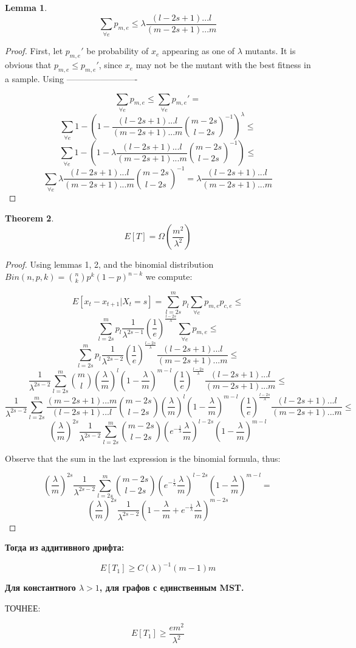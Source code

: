 \documentclass{article}
\newtheorem{theorem}{Theorem}[section]
\newtheorem{lemma}[theorem]{Lemma}
\begin{document}
\begin{lemma}
$$ \sum_{\forall e} p_{m,e}  \leq \lambda\frac{(l - 2s + 1)...l}{(m - 2s + 1)...m}$$
\end{lemma}
\begin{proof}
First, let  $p_{m,e}'$ be probability of $x_e$ appearing as one of $\lambda$ mutants. It is obvious that  $p_{m,e} \leq p_{m,e}'$, since $x_e$ may not be the mutant with the best fitness in a sample. Using -------------------------

$$
\sum_{\forall e} p_{m,e} \leq 
\sum_{\forall e} p_{m,e}' =
$$
$$
\sum_{\forall e} 1 - (1 - \frac{(l - 2s + 1)...l}{(m - 2s + 1)...m}\binom{m - 2s}{l - 2s}^{-1})^\lambda \leq
$$
$$
\sum_{\forall e} 1 - (1 - \lambda\frac{(l - 2s + 1)...l}{(m - 2s + 1)...m}\binom{m - 2s}{l - 2s}^{-1}) \leq
$$
$$
\sum_{\forall e} \lambda\frac{(l - 2s + 1)...l}{(m - 2s + 1)...m}\binom{m - 2s}{l - 2s}^{-1} = 
\lambda\frac{(l - 2s + 1)...l}{(m - 2s + 1)...m}
$$

\end{proof}
\begin{theorem}
$$E[T]=\Omega(\frac{m^2}{\lambda^2}) $$
\end{theorem}
\begin{proof}
Using lemmas 1, 2, and the binomial distribution $Bin(n, p, k)=\binom{n}{k}p^k(1-p)^{n-k}$ we compute:


$$
E[x_t - x_{t+1} | X_t = s] =  \sum_{l=2s}^{m} p_l \sum_{\forall e} p_{m,e} p_{c,e} \leq
$$
$$
 \sum_{l=2s}^{m} p_l  \frac{1}{\lambda^{2s - 1}}(\frac{1}{e})^\frac{l - 2s}{\lambda} \sum_{\forall e} p_{m,e} \leq
$$
$$
 \sum_{l=2s}^{m} p_l  \frac{1}{\lambda^{2s - 2}}(\frac{1}{e})^\frac{l - 2s}{\lambda} \frac{(l - 2s + 1)...l}{(m - 2s + 1)...m} \leq
$$
$$
  \frac{1}{\lambda^{2s - 2}} \sum_{l=2s}^{m} \binom{m}{l}(\frac{\lambda}{m})^l(1-\frac{\lambda}{m})^{m-l} (\frac{1}{e})^\frac{l - 2s}{\lambda} \frac{(l - 2s + 1)...l}{(m - 2s + 1)...m} \leq
$$
$$
  \frac{1}{\lambda^{2s - 2}} \sum_{l=2s}^{m} \frac{(m - 2s + 1)...m}{(l - 2s + 1)...l} \binom{m - 2s}{l - 2s}(\frac{\lambda}{m})^l(1-\frac{\lambda}{m})^{m-l} (\frac{1}{e})^\frac{l - 2s}{\lambda} \frac{(l - 2s + 1)...l}{(m - 2s + 1)...m} \leq
$$
$$
(\frac{\lambda}{m})^{2s}  \frac{1}{\lambda^{2s - 2}} \sum_{l=2s}^{m} \binom{m - 2s}{l - 2s}(e^{-\frac{1}{\lambda}}\frac{\lambda}{m})^{l - 2s}(1-\frac{\lambda}{m})^{m-l}
$$

Observe that the sum in the last expression is the binomial formula, thus:

$$
(\frac{\lambda}{m})^{2s}  \frac{1}{\lambda^{2s - 2}} \sum_{l=2s}^{m} \binom{m - 2s}{l - 2s}(e^{-\frac{1}{\lambda}}\frac{\lambda}{m})^{l - 2s}(1-\frac{\lambda}{m})^{m-l} =
$$
$$
(\frac{\lambda}{m})^{2s}  \frac{1}{\lambda^{2s - 2}} (1 - \frac{\lambda}{m} + e^{-\frac{1}{\lambda}}\frac{\lambda}{m})^{m - 2s}
$$

\end{proof}

\textbf{Тогда из аддитивного дрифта:}

$$
E[T_1] \geq C(\lambda)^{-1} (m - 1)m
$$

\textbf{Для константного  $\lambda > 1$, для графов с единственным MST.}

ТОЧНЕЕ:

$$
E[T_1] \geq \frac{e m^2}{\lambda^2}
$$
\end{document}
